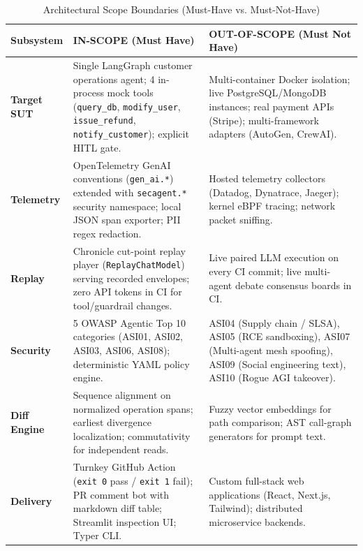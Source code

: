 \documentclass[11pt,a4paper]{article}
\begin{document}
\begin{table}[h!]
\centering
\small
\caption{Architectural Scope Boundaries (Must-Have vs. Must-Not-Have)}
\label{tab:scope_matrix}
\begin{tabularx}{\textwidth}{lp{6.8cm}p{7.2cm}}
\toprule
\textbf{Subsystem} & \textbf{IN-SCOPE (Must Have)} & \textbf{OUT-OF-SCOPE (Must Not Have)} \\
\midrule
\textbf{Target SUT} & Single LangGraph customer operations agent; 4 in-process mock tools (\texttt{query\_db}, \texttt{modify\_user}, \texttt{issue\_refund}, \texttt{notify\_customer}); explicit HITL gate. & Multi-container Docker isolation; live PostgreSQL/MongoDB instances; real payment APIs (Stripe); multi-framework adapters (AutoGen, CrewAI). \\
\addlinespace
\textbf{Telemetry} & OpenTelemetry GenAI conventions (\texttt{gen\_ai.*}) extended with \texttt{secagent.*} security namespace; local JSON span exporter; PII regex redaction. & Hosted telemetry collectors (Datadog, Dynatrace, Jaeger); kernel eBPF tracing; network packet sniffing. \\
\addlinespace
\textbf{Replay} & Chronicle cut-point replay player (\texttt{ReplayChatModel}) serving recorded envelopes; zero API tokens in CI for tool/guardrail changes. & Live paired LLM execution on every CI commit; live multi-agent debate consensus boards in CI. \\
\addlinespace
\textbf{Security} & 5 OWASP Agentic Top 10 categories (ASI01, ASI02, ASI03, ASI06, ASI08); deterministic YAML policy engine. & ASI04 (Supply chain / SLSA), ASI05 (RCE sandboxing), ASI07 (Multi-agent mesh spoofing), ASI09 (Social engineering text), ASI10 (Rogue AGI takeover). \\
\addlinespace
\textbf{Diff Engine} & Sequence alignment on normalized operation spans; earliest divergence localization; commutativity for independent reads. & Fuzzy vector embeddings for path comparison; AST call-graph generators for prompt text. \\
\addlinespace
\textbf{Delivery} & Turnkey GitHub Action (\texttt{exit 0} pass / \texttt{exit 1} fail); PR comment bot with markdown diff table; Streamlit inspection UI; Typer CLI. & Custom full-stack web applications (React, Next.js, Tailwind); distributed microservice backends. \\
\bottomrule
\end{tabularx}
\end{table}
\end{document}
